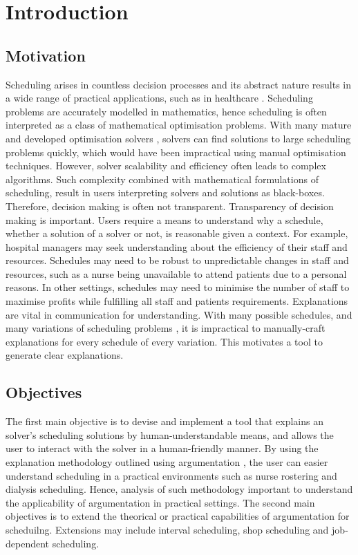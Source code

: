 \chapter{Introduction}
	
\section{Motivation}

Scheduling arises in countless decision processes and its abstract nature results in a wide range of practical applications, such as in healthcare \cite{sanr}. Scheduling problems are accurately modelled in mathematics, hence scheduling is often interpreted as a class of mathematical optimisation problems. With many mature and developed optimisation solvers \cite{clp}, solvers can find solutions to large scheduling problems quickly, which would have been impractical using manual optimisation techniques. However, solver scalability and efficiency often leads to complex algorithms. Such complexity combined with mathematical formulations of scheduling, result in users interpreting solvers and solutions as black-boxes. Therefore, decision making is often not transparent.
\linespace
Transparency of decision making is important. Users require a means to understand why a schedule, whether a solution of a solver or not, is reasonable given a context. For example, hospital managers may seek understanding about the efficiency of their staff and resources. Schedules may need to be robust to unpredictable changes in staff and resources, such as a nurse being unavailable to attend patients due to a personal reasons. In other settings, schedules may need to minimise the number of staff to maximise profits while fulfilling all staff and patients requirements.
\linespace
Explanations are vital in communication for understanding. With many possible schedules, and many variations of scheduling problems \cite{sta}, it is impractical to manually-craft explanations for every schedule of every variation. This motivates a tool to generate clear explanations.

\section{Objectives}

The first main objective is to devise and implement a tool that explains an solver's scheduling solutions by human-understandable means, and allows the user to interact with the solver in a human-friendly manner. By using the explanation methodology outlined using argumentation \cite{aes}, the user can easier understand scheduling in a practical environments such as nurse rostering and dialysis scheduling. Hence, analysis of such methodology important to understand the applicability of argumentation in practical settings.
\linespace
The second main objectives is to extend the theorical or practical capabilities of argumentation for scheduilng. Extensions may include interval scheduling, shop scheduling and job-dependent scheduling.

